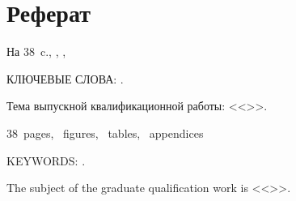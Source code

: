 \chapter*[Count-me]{Реферат} %
\thispagestyle{empty}%
%
%



На 38~c.,
,
,

{\MakeUppercase{Ключевые слова: \keywordsRu}.}

Тема выпускной квалификационной работы: <<\thesisTitle>>.


\abstractRu




\printTheAbstract %

38~pages, 
~figures, 
~tables,
~appendices%

{\MakeUppercase{Keywords: \keywordsEn}.} %
	
The subject of the graduate qualification work is <<\thesisTitleEn>>.
	
	
\abstractEn %

	


\thispagestyle{empty}
%
